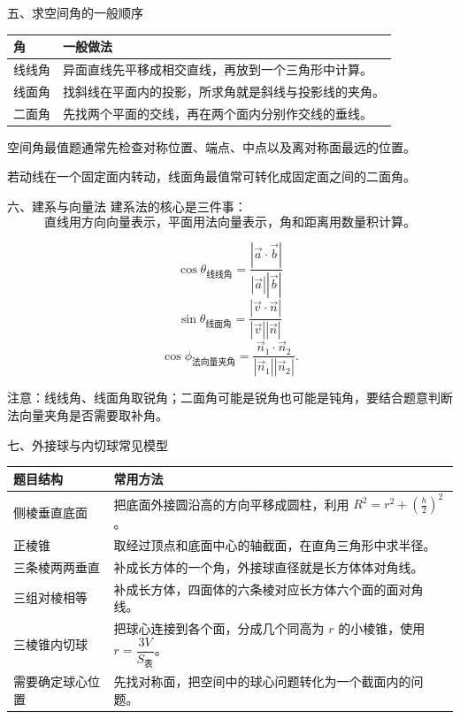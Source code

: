 \documentclass[11pt,a4paper]{ctexart}
\begin{document}
\newpage

\begin{modelbox}{五、求空间角的一般顺序}
\renewcommand{\arraystretch}{1.35}
\begin{tabularx}{\textwidth}{p{3.0cm}X}
\toprule
角 & 一般做法 \\
\midrule
线线角 & 异面直线先平移成相交直线，再放到一个三角形中计算。\\ \hline
线面角 & 找斜线在平面内的投影，所求角就是斜线与投影线的夹角。\\ \hline
二面角 & 先找两个平面的交线，再在两个面内分别作交线的垂线。\\
\bottomrule
\end{tabularx}

空间角最值题通常先检查对称位置、端点、中点以及离对称面最远的位置。

若动线在一个固定面内转动，线面角最值常可转化成固定面之间的二面角。
\end{modelbox}

\begin{modelbox}{六、建系与向量法}
建系法的核心是三件事：
\[
  \text{直线用方向向量表示，平面用法向量表示，角和距离用数量积计算。}
\]

\[
  \cos\theta_{\text{线线角}}
  =
  \frac{|\vec a\cdot\vec b|}{|\vec a||\vec b|}
\]
\[
  \sin\theta_{\text{线面角}}
  =
  \frac{|\vec v\cdot\vec n|}{|\vec v||\vec n|}
\]
\[
  \cos\phi_{\text{法向量夹角}}
  =
  \frac{\vec n_1\cdot\vec n_2}{|\vec n_1||\vec n_2|}.
\]

注意：线线角、线面角取锐角；二面角可能是锐角也可能是钝角，要结合题意判断法向量夹角是否需要取补角。
\end{modelbox}

\begin{modelbox}{七、外接球与内切球常见模型}
\renewcommand{\arraystretch}{1.35}
\begin{tabularx}{\textwidth}{p{3.4cm}X}
\toprule
题目结构 & 常用方法 \\
\midrule
侧棱垂直底面 & 把底面外接圆沿高的方向平移成圆柱，利用 \(R^2=r^2+\left(\frac h2\right)^2\)。\\ \hline
正棱锥 & 取经过顶点和底面中心的轴截面，在直角三角形中求半径。\\ \hline
三条棱两两垂直 & 补成长方体的一个角，外接球直径就是长方体体对角线。\\ \hline
三组对棱相等 & 补成长方体，四面体的六条棱对应长方体六个面的面对角线。\\ \hline
三棱锥内切球 & 把球心连接到各个面，分成几个同高为 \(r\) 的小棱锥，使用 \(r=\dfrac{3V}{S_{\text{表}}}\)。\\ \hline
需要确定球心位置 & 先找对称面，把空间中的球心问题转化为一个截面内的问题。\\
\bottomrule
\end{tabularx}
\end{modelbox}
\end{document}
